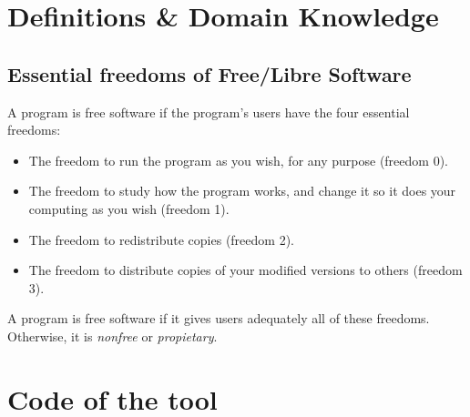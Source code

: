 \documentclass[a4paper, 12pt]{book}
\begin{document}
\chapter{Definitions & Domain Knowledge}
\label{app:definitions}

\section{Essential freedoms of Free/Libre Software}
\label{sec:freedoms}
A program is free software if the program's users have the four essential freedoms:
\begin{itemize}
   \item The freedom to run the program as you wish, for any purpose (freedom 0).
   \item The freedom to study how the program works, and change it so it does your computing as you wish (freedom 1).
   \item The freedom to redistribute copies (freedom 2).
   \item The freedom to distribute copies of your modified versions to others (freedom 3).
\end{itemize}
A program is free software if it gives users adequately all of these freedoms. Otherwise, it is \textit{nonfree} or \textit{propietary}.
\chapter{Code of the tool}
\label{app:code}

\end{document}
